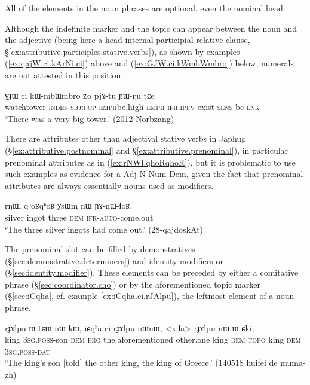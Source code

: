 All of the elements in the noun phrases are optional, even the nominal head.

Although the indefinite marker  and the topic  can appear between the noun and the adjective (being here a head-internal participial relative clause, §\ref{ex:attributive.participles.stative.verbs}), as shown by examples (\ref{ex:qajW.ci.kArNi.ci}) above and (\ref{ex:GJW.ci.kWmbWmbro}) below, numerals are not attested in this position.

\begin{exe}
\ex \label{ex:GJW.ci.kWmbWmbro}
 \gll ɣɟɯ ci kɯ-mbɯ\redp{}mbro ʑo pjɤ-tu ɲɯ-ŋu tɕe   \\
 watchtower \textsc{indef} \textsc{sbj}:\textsc{pcp}-\textsc{emph}\redp{}be.high \textsc{emph} \textsc{ifr}.\textsc{ipfv}-exist \textsc{sens}-be \textsc{lnk} \\
\glt  `There was a very big tower.' (2012 Norbzang) 	
\end{exe}

There are attributes other than adjectival stative verbs in Japhug (§\ref{ex:attributive.postnominal} and §\ref{ex:attributive.prenominal}), in particular prenominal attributes as  in (\ref{ex:rNWl.qhoRqhoR}), but it is problematic to use such examples as evidence for a Adj-N-Num-Dem, given the fact that prenominal attributes are always essentially nouns used as modifiers.

 \begin{exe}
\ex \label{ex:rNWl.qhoRqhoR}
\gll  rŋɯl qʰoʁqʰoʁ χsɯm nɯ ɲɤ-nɯ-ɬoʁ. \\
silver ingot three \textsc{dem} \textsc{ifr}-\textsc{auto}-come.out \\
\glt `The three silver ingots had come out.' (28-qajdoskAt)
\end{exe}

The prenominal slot can be filled by demonstratives (§\ref{sec:demonstrative.determiners}) and identity modifiers  or  (§\ref{sec:identity.modifier}). These elements can be preceded by either a comitative  phrase (§\ref{sec:coordinator.cho}) or by the aforementioned topic marker  (§\ref{sec:iCqha}, cf. example \ref{ex:iCqha.ci.rJAlpu}), the leftmost element of a noun phrase.

 \begin{exe}
\ex \label{ex:iCqha.ci.rJAlpu}
\gll rɟɤlpu ɯ-tɕɯ nɯ kɯ, iɕqʰa ci rɟɤlpu nɯnɯ, <xila> rɟɤlpu nɯ ɯ-ɕki, \\
king \textsc{3sg}.\textsc{poss}-son \textsc{dem} \textsc{erg} the.aforementioned other.one king \textsc{dem}  \textsc{topo} king \textsc{dem} \textsc{3sg}.\textsc{poss}-\textsc{dat} \\
\glt `The king's son [told] the other king, the king of Greece.' (140518 huifei de muma-zh)
\end{exe}

 
